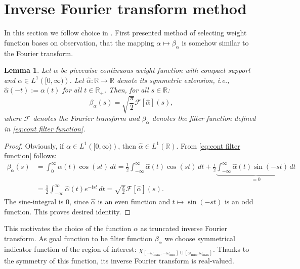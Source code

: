 \documentclass[a4paper,11pt,bibliography=totoc,listof=totoc,headinclude=true,cleardoublepage=empty,oneside]{scrbook}
\newtheorem{lemma}[theorem]{Lemma}
\newcommand{\R}{\mathbb{R}}
\renewcommand{\i}{\mathrm{i}}
\newcommand{\F}{\mathcal{F}}
\begin{document}
\section{Inverse Fourier transform method}
In this section we follow choice in \cite{nannen}. First presented method of selecting weight function bases on observation, that the mapping $ \alpha \mapsto \beta_\alpha$ is somehow similar to the Fourier transform. 
\begin{lemma}\label{lemma:alpha fourier}
    Let $\alpha$ be piecewise continuous weight function with compact support and $\alpha \in L^1\left( [0, \infty) \right)$. Let $\hat{\alpha}: \R \rightarrow \R$ denote its symmetric extension, i.e., $\hat{\alpha}(-t) := \alpha(t)$ for all $t\in \R_+$. Then, for all $s\in \R$:
    \begin{equation*}
        \beta_\alpha (s) = \sqrt{\frac{\pi}{2}} \F\left[\hat{\alpha}\right] (s),
    \end{equation*}
    where $\mathcal{F}$ denotes the Fourier transform and $\beta_\alpha$ denotes the filter function  defined in \eqref{eq:cont filter function}.
\end{lemma}
\begin{proof}
    Obviously, if $\alpha \in L^1\left([0, \infty)\right)$, then $\hat{\alpha} \in L^1\left(\R\right)$. From \eqref{eq:cont filter function} follows:
    \begin{align*}
        \beta_\alpha (s) &= \int_0^\infty \alpha(t) \cos(s t) \,dt = \frac{1}{2}\int_{-\infty}^\infty \hat{\alpha}(t) \cos(s t) \,dt + \frac{\i}{2} \underbrace{\int_{-\infty}^\infty \hat{\alpha}(t) \sin(-st) \,dt}_{=0} \\&= \frac{1}{2} \int_{-\infty}^{\infty} \hat{\alpha}(t) e^{-\i st} \, dt = \sqrt{\frac{\pi}{2}} \F\left[\hat{\alpha}\right] (s).
    \end{align*}
    The sine-integral is 0, since $\hat{\alpha}$ is an even function and $t \mapsto \sin(-st)$ is an odd function. This proves desired identity.
\end{proof}

This motivates the choice of the function $\alpha$ as truncated inverse Fourier transform. As goal function to be filter function $\beta_\alpha$ we choose symmetrical indicator function of the region of interest: $\chi_{\left[-\omega_{\max}, -\omega_{\min}\right]\cup\left[\omega_{\min}, \omega_{\max}\right]}$. Thanks to the symmetry of this function, its inverse Fourier transform is real-valued.
\end{document}
